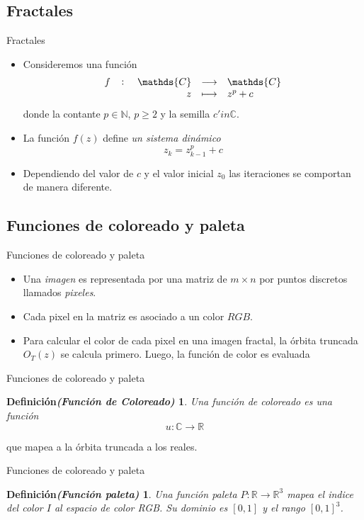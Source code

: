 \documentclass[11pt]{beamer}
\newtheorem{defi3}{{Definición}{\it (Función de Coloreado)}}[section]
\newtheorem{defi4}{{Definición}{\it (Función paleta)}}[section]
\begin{document}
\subsection{Fractales}
\begin{frame}{Fractales}
	\begin{itemize}
		\item Consideremos una función \[ \fullfunction{f}{\mathds{C}}{\mathds{C}}{z}{z^p + c} \] donde la contante $p\in\mathds{N}$, $p\geq 2$ y la semilla $c'in\mathds{C}$.
		
		\item La función $f(z)$ define \textit{un sistema dinámico}
		\[ z_k = z_{k-1}^{p} + c \]
		
		\item Dependiendo del valor de $c$ y el valor inicial $z_0$ las iteraciones se comportan de manera diferente.
\end{itemize}		
\end{frame}

\subsection{Funciones de coloreado y paleta}
\begin{frame}{Funciones de coloreado y paleta}
	\begin{itemize}
		\item Una \textit{imagen} es representada por una matriz de $m\times n$ por puntos discretos llamados \textit{pixeles}.
		\item Cada pixel en la matriz es asociado a un color $RGB$.
\item Para calcular el color de cada pixel en una imagen fractal, la órbita truncada $O_T(z)$ se calcula primero. Luego, la función de color es evaluada
	\end{itemize}
\end{frame}

\begin{frame}{Funciones de coloreado y paleta}
	\begin{defi3}
		Una función de coloreado es una función
		\[ u:\mathds{C}\to\mathds{R} \]
	\end{defi3}
	que mapea a la órbita truncada a los reales.
\end{frame}

\begin{frame}{Funciones de coloreado y paleta}
	\begin{defi4}
		Una función paleta $P:\mathds{R}\to\mathds{R}^3$ mapea el indice del color $I$ al espacio de color RGB. Su dominio es $[0,1]$ y el rango $[0,1]^3$.
	\end{defi4}
\end{frame}
\end{document}
